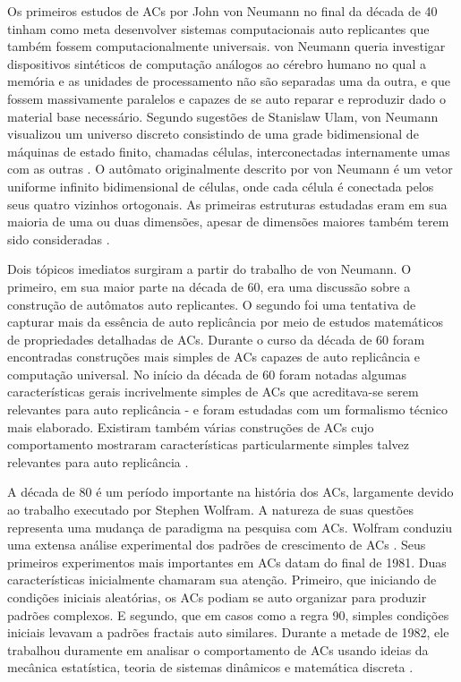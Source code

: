 \documentclass[12pt,a4paper]{article}
\begin{document}
Os primeiros estudos de ACs por John von Neumann no final da década de
40 tinham como meta desenvolver sistemas computacionais auto replicantes que também fossem
computacionalmente universais. von Neumann queria investigar dispositivos sintéticos de
computação análogos ao cérebro humano no qual a memória e as unidades de processamento
não são separadas uma da outra, e que fossem massivamente paralelos e capazes de se
auto reparar e reproduzir dado o material base necessário. Segundo sugestões de
Stanislaw Ulam, von Neumann visualizou um universo discreto consistindo de uma grade
bidimensional de máquinas de estado finito, chamadas células, interconectadas
internamente umas com as outras . O autômato originalmente descrito por
von Neumann é um vetor uniforme infinito bidimensional de células, onde cada célula é
conectada pelos seus quatro vizinhos ortogonais. As primeiras estruturas estudadas eram
em sua maioria de uma ou duas dimensões, apesar de dimensões maiores também terem sido
consideradas .

Dois tópicos imediatos surgiram a partir do trabalho de von Neumann. O primeiro, em
sua maior parte na década de 60, era uma discussão sobre a construção de autômatos
auto replicantes. O segundo foi uma tentativa de capturar mais da essência de
auto replicância por meio de estudos matemáticos de propriedades detalhadas de
ACs. Durante o curso da década de 60 foram encontradas construções
mais simples de ACs capazes de auto replicância e computação
universal. No início da década de 60 foram notadas algumas características gerais
incrivelmente simples de ACs que acreditava-se serem relevantes para
auto replicância - e foram estudadas com um formalismo técnico mais elaborado. Existiram
também várias construções de ACs cujo comportamento mostraram
características particularmente simples talvez relevantes para auto replicância
.

A década de 80 é um período importante na história dos ACs,
largamente devido ao trabalho executado por Stephen Wolfram. A natureza de suas questões
representa uma mudança de paradigma na pesquisa com ACs. Wolfram conduziu
uma extensa análise experimental dos padrões de crescimento de ACs
. Seus primeiros experimentos mais importantes em ACs
datam do final de 1981. Duas características inicialmente chamaram sua atenção.
Primeiro, que iniciando de condições iniciais aleatórias, os ACs
podiam se auto organizar para produzir padrões complexos. E segundo, que em casos
como a regra 90, simples condições iniciais levavam a padrões fractais auto similares.
Durante a metade de 1982, ele trabalhou duramente em analisar o comportamento de
ACs usando ideias da mecânica estatística, teoria de sistemas
dinâmicos e matemática discreta .
\end{document}
